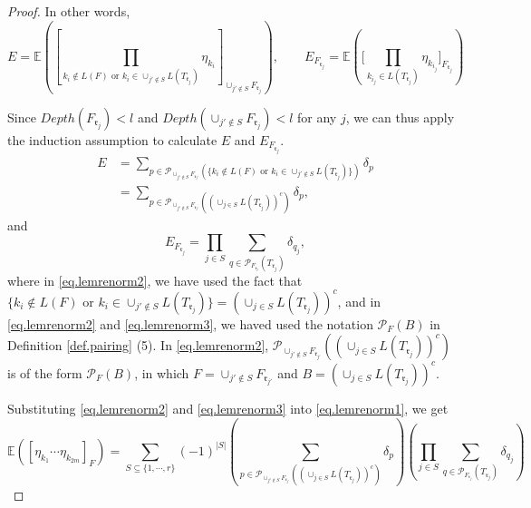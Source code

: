 \begin{proof}
 
 In other words, 
 \begin{equation}
  E = \mathbb{E}\left(\left[\prod_{k_i\notin L(F)\text{ or }k_i\in \cup_{j'\notin S}L(T_{\mathfrak{r}_j})}\eta_{k_i}\right]_{\cup_{j'\notin S}F_{\mathfrak{r}_j}}\right), 
  \qquad 
  E_{F_{\mathfrak{r}_j}} = \mathbb{E}\left(\Bigg[\prod_{k_{i_{j}}\in L(T_{\mathfrak{r}_j})}\eta_{k_{i_j}}\Bigg]_{F_{\mathfrak{r}_j}}\right)
 \end{equation}
 
 Since $Depth(F_{\mathfrak{r}_j})<l$ and $Depth(\cup_{j'\notin S}F_{\mathfrak{r}_j})<l$ for any $j$, we can thus apply the induction assumption to calculate $E$ and $E_{F_{\mathfrak{r}_j}}$.
 \begin{equation}\label{eq.lemrenorm2}
  \begin{split}
  E &= \sum_{p\in \mathcal{P}_{\cup_{j'\notin S} F_{\mathfrak{r}_{j'}}}(\{k_i\notin L(F)\text{ or }k_i\in \cup_{j'\notin S}L(T_{\mathfrak{r}_j})\})}\delta_p
  \\
  &= \sum_{p\in \mathcal{P}_{\cup_{j'\notin S} F_{\mathfrak{r}_{j'}}}((\cup_{j\in S}L(T_{\mathfrak{r}_j}))^c)}\delta_p,
  \end{split}
 \end{equation}
 and
 \begin{equation}\label{eq.lemrenorm3}
  E_{F_{\mathfrak{r}_j}} = \prod_{j\in S}\sum_{q\in \mathcal{P}_{F_{\mathfrak{r}_j}}(T_{\mathfrak{r}_j})} \delta_{q_j},
 \end{equation}
 where in \eqref{eq.lemrenorm2}, we have used the fact that $\{k_i\notin L(F)\text{ or }k_i\in \cup_{j'\notin S}L(T_{\mathfrak{r}_j})\} = (\cup_{j\in S}L(T_{\mathfrak{r}_j}))^c$, and in \eqref{eq.lemrenorm2} and \eqref{eq.lemrenorm3}, we haved used the notation $\mathcal{P}_{F}(B)$ in Definition \ref{def.pairing} (5). In \eqref{eq.lemrenorm2}, $\mathcal{P}_{\cup_{j'\notin S} F_{\mathfrak{r}_{j'}}}((\cup_{j\in S}L(T_{\mathfrak{r}_j}))^c)$ is of the form $\mathcal{P}_{F}(B)$, in which $F = \cup_{j'\notin S} F_{\mathfrak{r}_{j'}}$ and $B = (\cup_{j\in S}L(T_{\mathfrak{r}_j}))^c$.
 
 Substituting \eqref{eq.lemrenorm2} and \eqref{eq.lemrenorm3} into \eqref{eq.lemrenorm1}, we get 
 \begin{equation}
  \mathbb{E}([\eta_{k_1}\cdots \eta_{k_{2m}}]_F) =\sum_{S\subseteq\{1,\cdots,r\}}(-1)^{|S|}
  \left(\sum_{p\in \mathcal{P}_{\cup_{j'\notin S} F_{\mathfrak{r}_{j'}}}((\cup_{j\in S}L(T_{\mathfrak{r}_j}))^c)}\delta_p\right)
  \left(\prod_{j\in S}\sum_{q\in \mathcal{P}_{F_{\mathfrak{r}_j}}(T_{\mathfrak{r}_j})} \delta_{q_j}\right)
 \end{equation}
 

\end{proof}
